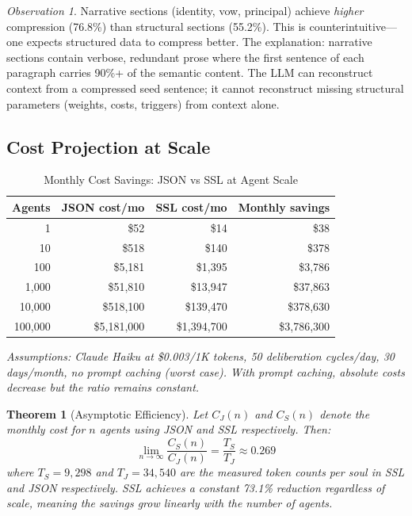 \documentclass[12pt,a4paper]{article}
\theoremstyle{plain}
\newtheorem{theorem}{Theorem}[section]
\theoremstyle{definition}
\theoremstyle{remark}
\newtheorem*{observation}{Observation}
\begin{document}
\begin{observation}
Narrative sections (identity, vow, principal) achieve \emph{higher} compression (76.8\%) than structural sections (55.2\%). This is counterintuitive---one expects structured data to compress better. The explanation: narrative sections contain verbose, redundant prose where the first sentence of each paragraph carries 90\%+ of the semantic content. The LLM can reconstruct context from a compressed seed sentence; it cannot reconstruct missing structural parameters (weights, costs, triggers) from context alone.
\end{observation}

\subsection{Cost Projection at Scale}

\begin{table}[H]
\centering
\caption{Monthly Cost Savings: JSON vs SSL at Agent Scale}
\label{tab:cost}
\begin{tabular}{@{}rrrr@{}}
\toprule
\textbf{Agents} & \textbf{JSON cost/mo} & \textbf{SSL cost/mo} & \textbf{Monthly savings} \\
\midrule
1 & \$52 & \$14 & \$38 \\
10 & \$518 & \$140 & \$378 \\
100 & \$5,181 & \$1,395 & \$3,786 \\
1,000 & \$51,810 & \$13,947 & \$37,863 \\
10,000 & \$518,100 & \$139,470 & \$378,630 \\
100,000 & \$5,181,000 & \$1,394,700 & \$3,786,300 \\
\bottomrule
\end{tabular}
\end{table}

\textit{Assumptions: Claude Haiku at \$0.003/1K tokens, 50 deliberation cycles/day, 30 days/month, no prompt caching (worst case). With prompt caching, absolute costs decrease but the ratio remains constant.}

\begin{theorem}[Asymptotic Efficiency]
Let $C_J(n)$ and $C_S(n)$ denote the monthly cost for $n$ agents using JSON and SSL respectively. Then:
\[
\lim_{n \to \infty} \frac{C_S(n)}{C_J(n)} = \frac{T_S}{T_J} \approx 0.269
\]
where $T_S = 9{,}298$ and $T_J = 34{,}540$ are the measured token counts per soul in SSL and JSON respectively. SSL achieves a constant 73.1\% reduction regardless of scale, meaning the savings grow linearly with the number of agents.
\end{theorem}
\end{document}

